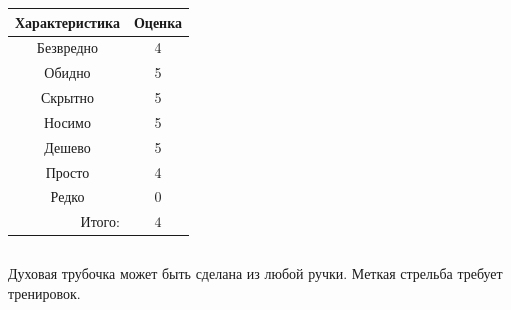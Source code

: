 \begin{frame}
\begin{columns}
            \begin{center}
                \begin{tabular}{c|c}
                    \hline\hline
                    Характеристика              & Оценка\\ \hline\hline
                    Безвредно                   & 4 \\
                    Обидно                      & 5 \\
                    Скрытно                     & 5 \\
                    Носимо                      & 5 \\
                    Дешево                      & 5 \\
                    Просто                      & 4 \\ 
                    Редко                       & 0 \\ \hline
                    \multicolumn{1}{r|}{Итого:} & $4$ \\
                \end{tabular}
            \end{center}
    \end{columns}    
\end{frame}

Духовая трубочка может быть сделана из любой ручки. Меткая стрельба требует тренировок.


